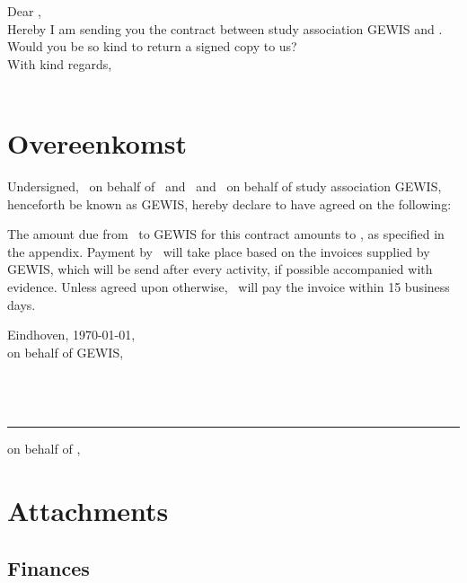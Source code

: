 \documentclass[
 digital,         %
 english         %
]{GEWISLetter}
\newcommand{\GEWIScontact}{%
\\%
}
\newcommand{\contractantOne}{%
}
\newcommand{\contractantTwo}{%
}
\newcommand{\COMPANYcontact}{%
}
\begin{document}
\GEWISfirstpage                 %
\printadresenkenmerk            %

Dear %
,\\[2\baselineskip]
Hereby I am sending you the contract between study association GEWIS and \GEWISRecipient . Would you be so kind to return a signed copy to us?
\\[2\baselineskip]

With kind regards,\\[2\baselineskip]
\GEWIScontact

\section{Overeenkomst}
Undersigned, \COMPANYcontact\ on behalf of \GEWISRecipient\, and \contractantOne\ and \contractantTwo\ on behalf of study association GEWIS, henceforth be known as GEWIS, hereby declare to have agreed on the following:

The amount due from \GEWISRecipient\ to GEWIS for this contract amounts to %
, as specified in the appendix. Payment by \GEWISRecipient\ will take place based on the invoices supplied by GEWIS, which will be send after every activity, if possible accompanied with evidence. Unless agreed upon otherwise, \GEWISRecipient\ will pay the invoice within 15 business days.
\\[2\baselineskip]

\begin{minipage}[t]{0.4\textwidth}
Eindhoven, \today,\\
on behalf of GEWIS,
\\[3\baselineskip]
\\
\\[3\baselineskip]
\\
\end{minipage}
\hfill
\begin{minipage}[t]{0.4\textwidth}
\rule{\textwidth}{0.4pt}
on behalf of \GEWISRecipient,\\[3\baselineskip]
\COMPANYcontact
\end{minipage}


\section{Attachments}

\subsection{Finances}
\end{document}
